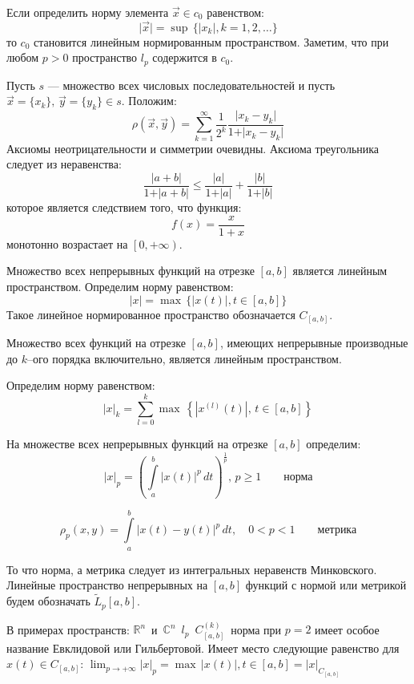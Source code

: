 Если определить норму элемента $\vec{x} \in c_0$ равенством:
$$
\vert\vec{x}\vert = \sup\, \{\vert x_k\vert , k = 1, 2, \ldots\}
$$
то $c_0$ становится линейным нормированным пространством. Заметим, что
при любом  $p > 0$ пространство $l_p$ содержится в $c_0$.


Пусть $s$ --- множество всех числовых последовательностей и пусть
$\vec{x} = \{x_k\},\, \vec{y} =\{y_k\} \in s$.
Положим:
$$
\rho(\vec{x},\vec{y}) =\sum^{\infty}_{k=1} \frac{1}{2^k}
 \frac{\vert x_k - y_k\vert}{1 + \vert x_k - y_k\vert}
$$
Аксиомы неотрицательности и симметрии очевидны. Аксиома треугольника следует из неравенства:
$$
\frac{\vert a + b\vert}{1 + \vert a + b\vert} \leqslant
 \frac{\vert a\vert}{1 + \vert a\vert} + \frac{\vert b\vert }{1 + \vert b\vert }
$$
которое является следствием того, что функция:
$$
f(x)  = \frac{x}{1 + x}
$$
монотонно возрастает на $\left[ 0, + \infty\right)$.

Множество всех непрерывных функций на отрезке $\left[a,b\right]$ является
линейным пространством.
Определим норму равенством:
$$
\vert x\vert = \max\, \{\vert x(t)\vert , t\in \left[a,b\right]\}
$$
Такое линейное нормированное пространство обозначается $C_{\left[a,b\right]}$.


Множество всех функций на отрезке $\left[a, b\right]$, имеющих непрерывные
производные до $k$--ого порядка включительно, является линейным пространством.


Определим норму равенством:
$$
\vert x\vert_k = \sum^k_{l=0} 
	\max\, \left\{ \left| x^{(l)} (t)\right|,\, t \in \left[a, b\right]\right\}
$$


На множестве всех непрерывных функций на отрезке $\left[a, b\right]$ определим:
$$
\vert x\vert_p = \left(\int\limits^{b}_{a} \left|x (t)\right|^p\, dt
       	\right)^{\frac{1}{p}},\, p \geqslant 1\qquad\text{норма}
$$

$$
\rho_p (x, y) = \int\limits^b_a \left|x (t) - y (t)\right|^{p}\, dt, \quad 0 < p < 1
\qquad\text{метрика}
$$


То что норма, а метрика следует из интегральных
неравенств Минковского.
Линейные пространство непрерывных на $\left[a, b\right]$ функций с
нормой или метрикой будем обозначать $\widetilde{L}_p \left[a, b\right]$.

\noindent
{}
В примерах пространств: 
$\mathbb{R}^n$\, и\, $\mathbb{C}^n$\,
$l_p$\, $C^{\left( k \right)}_{\left[a, b\right]}$\,
норма при $p = 2$ имеет особое название Евклидовой или Гильбертовой.
Имеет место следующие равенство для $x(t)\in C_{\left[a,b\right]}$:
$
\lim_{p \to +\infty} \vert x\vert_p = \max\, {\vert x (t)\vert,
t\in\left[a, b\right]} = \vert x\vert_{C_{\left[a,b\right]}}
$

